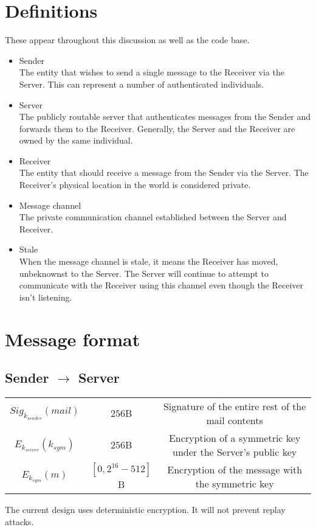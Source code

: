 \documentclass[11pt]{article}
\begin{document}
\pagebreak
\section*{Definitions}
These appear throughout this discussion as well as the code base.
\begin{itemize}
\item Sender \\
The entity that wishes to send a single message to the Receiver via the Server.
This can represent a number of authenticated individuals.
\item Server \\
The publicly routable server that authenticates messages from the Sender and
forwards them to the Receiver. Generally, the Server and the Receiver are
owned by the same individual.
\item Receiver \\
The entity that should receive a message from the Sender via the Server. The
Receiver's physical location in the world is considered private.
\item Message channel \\
The private communication channel established between the Server and Receiver.
\item Stale \\
When the message channel is stale, it means the Receiver has moved, unbeknownst
to the Server. The Server will continue to attempt to communicate with the
Receiver using this channel even though the Receiver isn't listening.
\end{itemize}
\pagebreak

\section*{Message format}
\subsection*{Sender $\rightarrow$ Server}
\begin{tabular}{c c c}
  $Sig_{k_{sender}}\left(mail\right)$ & $256$B &
    Signature of the entire rest of the mail contents\\
  $E_{k_{server}}\left(k_{sym}\right)$ & $256$B &
    Encryption of a symmetric key under the Server's public key\\
  $E_{k_{sym}}\left(m\right)$ & $\left[0, 2^{16} - 512 \right]$B &
    Encryption of the message with the symmetric key
\end{tabular}
The current design uses deterministic encryption. It will not prevent replay
attacks.
\end{document}
